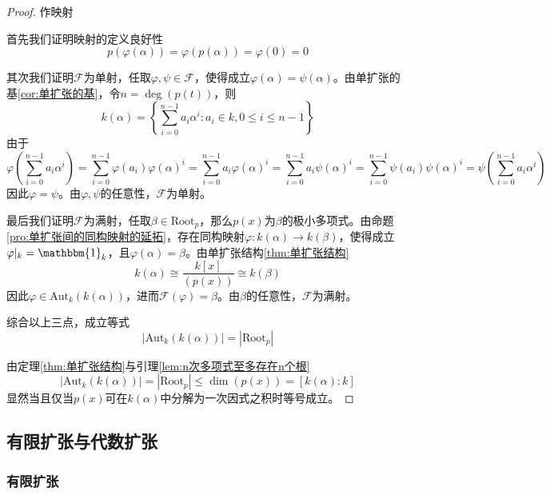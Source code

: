 \begin{proof}
	作映射
	
	首先我们证明映射的定义良好性
	$$
	p(\varphi(\alpha))
	=\varphi(p(\alpha))
	=\varphi(0)
	=0
	$$
	
	其次我们证明$\mathscr{F}$为单射，任取$\varphi,\psi\in \mathscr{F}$，使得成立$\varphi(\alpha)=\psi(\alpha)$。由单扩张的基\ref{cor:单扩张的基}，令$n=\deg(p(t))$，则
	$$
	k(\alpha)=\left\{ \sum_{i=0}^{n-1}a_i\alpha^i:a_i\in k,0\le i \le n-1 \right\}
	$$
	由于
	$$
	\varphi\left(\sum_{i=0}^{n-1}a_i\alpha^i\right)
	=\sum_{i=0}^{n-1}\varphi(a_i)\varphi(\alpha)^i
	=\sum_{i=0}^{n-1}a_i\varphi(\alpha)^i
	=\sum_{i=0}^{n-1}a_i\psi(\alpha)^i
	=\sum_{i=0}^{n-1}\psi(a_i)\psi(\alpha)^i
	=\psi\left(\sum_{i=0}^{n-1}a_i\alpha^i\right)
	$$
	因此$\varphi=\psi$。由$\varphi,\psi$的任意性，$\mathscr{F}$为单射。
	
	最后我们证明$\mathscr{F}$为满射，任取$\beta\in \text{Root}_p$，那么$p(x)$为$\beta$的极小多项式。由命题\ref{pro:单扩张间的同构映射的延拓}，存在同构映射$\varphi:k(\alpha)\to k(\beta)$，使得成立$\varphi|_{k}=\mathbbm{1}_k$，且$\varphi(\alpha)=\beta$。由单扩张结构\ref{thm:单扩张结构}%
	$$
	k(\alpha)\cong\frac{k[x]}{(p(x))}\cong k(\beta)
	$$
	因此$\varphi\in \text{Aut}_k(k(\alpha))$，进而$\mathscr{F}(\varphi)=\beta$。由$\beta$的任意性，$\mathscr{F}$为满射。
	
	综合以上三点，成立等式%
	$$
	|\text{Aut}_k(k(\alpha))|=|\text{Root}_p|
	$$
	
	由定理\ref{thm:单扩张结构}与引理\ref{lem:n次多项式至多存在n个根}
	$$
	|\text{Aut}_k(k(\alpha))|
	=|\text{Root}_p|
	\le\dim(p(x))
	=[k(\alpha):k]
	$$
	显然当且仅当$p(x)$可在$k(\alpha)$中分解为一次因式之积时等号成立。
\end{proof}

\subsection{有限扩张与代数扩张}

\subsubsection{有限扩张}

